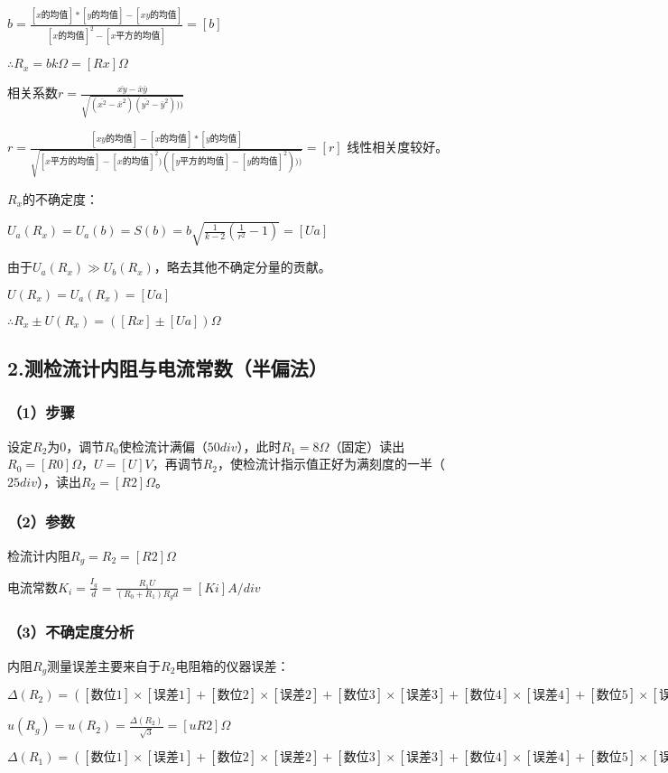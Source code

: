 \documentclass[11pt,a4paper,oneside]{article}
\begin{document}
$b = \displaystyle\frac{[x的均值]*[y的均值]-[xy的均值]}{[x的均值]^2-[x平方的均值]} = [b]$

$\therefore R_x = b k\Omega =[Rx]\Omega $

相关系数$r = \displaystyle\frac{\bar{xy}-\bar{x}\bar{y}}{\sqrt{(\bar{x^2}-\bar{x}^2)(\bar{y^2}-\bar{y}^2)))}}$

$r = \displaystyle\frac{[xy的均值]-[x的均值]*[y的均值]}{\sqrt{[x平方的均值]-[x的均值]^2)([y平方的均值]-[y的均值]^2)))}} = [r]$
线性相关度较好。

$R_x$的不确定度：

$U_a(R_x) = U_a(b) = S(b) = b\sqrt{\displaystyle\frac{1}{k-2}(\displaystyle\frac{1}{r^2}-1)} = [Ua]$

由于$U_a(R_x) \gg U_b(R_x)$，略去其他不确定分量的贡献。

$U(R_x) = U_a(R_x) = [Ua]$

$\therefore R_x \pm U(R_x) = ([Rx]\pm [Ua])\Omega $

\subsection{2.测检流计内阻与电流常数（半偏法）}
\subsubsection{（1）步骤}
设定$R_2$为0，调节$R_0$使检流计满偏（$50div$），此时$R_1 = 8\Omega$（固定）读出$R_0 = [R0]\Omega$，$U = [U]V$，再调节$R_2$，使检流计指示值正好为满刻度的一半（$25div$），读出$R_2 = [R2]\Omega$。
\subsubsection{（2）参数}
检流计内阻$R_g = R_2 = [R2]\Omega$

电流常数$K_i = \displaystyle\frac{I_g}{d} = \displaystyle\frac{R_1 U}{(R_0 + R_1)R_g d} = [Ki]A/div$

\subsubsection{（3）不确定度分析}
内阻$R_g$测量误差主要来自于$R_2$电阻箱的仪器误差：

$\Delta(R_2) = ([数位1]\times [误差1]+[数位2]\times[误差2]+[数位3]\times[误差3]+[数位4]\times[误差4]+[数位5]\times[误差5])\Omega = [deltaR2]\Omega$

$u(R_g) = u(R_2) = \displaystyle\frac{\Delta (R_2)}{\sqrt{3}} = [uR2]\Omega$

$\Delta(R_1) = ([数位1]\times [误差1]+[数位2]\times[误差2]+[数位3]\times[误差3]+[数位4]\times[误差4]+[数位5]\times[误差5])\Omega = [deltaR1]$
\end{document}
